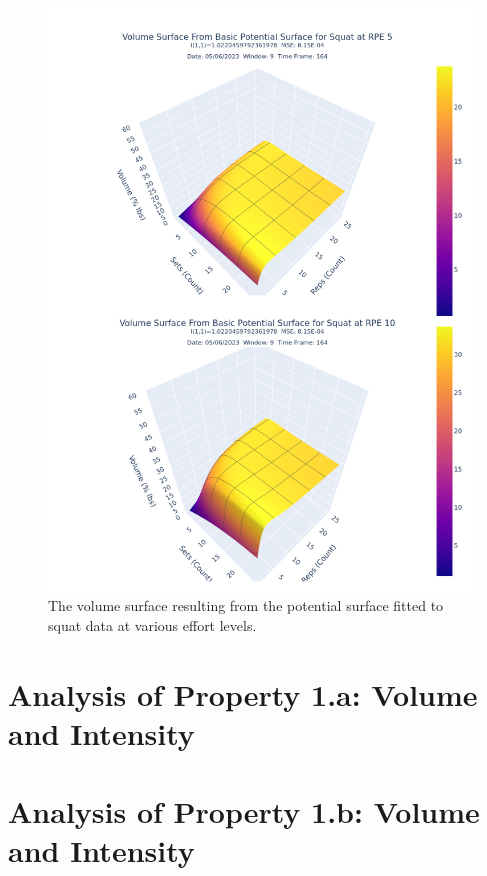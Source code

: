\begin{figure}[htbp]
    \centering
    \includegraphics[scale=0.55]{images/ch3/Volume/DualSquat.Effort[5,10].volumeBase.png}
    \caption{The volume surface resulting from the potential surface fitted to squat data at various effort levels.}
    \label{fig:VolumeBaseSquatPotentialSurfaceVolumeAcrossEffort}
\end{figure}

\section{Analysis of Property 1.a: Volume and Intensity}
\label{sec:VolumeBasePotentialSurfaceProperty1a}

\section{Analysis of Property 1.b: Volume and Intensity}
\label{sec:VolumeBasePotentialSurfaceProperty1b}

